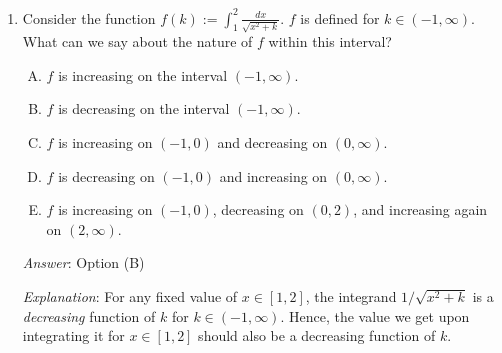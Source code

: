 \documentclass[10pt]{amsart}
\begin{document}
\begin{enumerate}
  \begin{enumerate}[(A)]
  \item $x\sqrt{1 + x^2}$
  \item $x^2\sqrt{1 + x^2}$
  \item $x(1 + x^2)^{1/3}$
  \item $x\sqrt{1 + x^3}$
  \item $x^2\sqrt{1 + x^3}$
  \end{enumerate}

  {\em Answer}: Option (D)

  {|em Explanation}: For options (A) and (C), the substitution $u = 1
  + x^2$ works fine. For option (E), the substitution $u = 1 + x^3$
  works fine. For option (B), we can solve the problem using a
  trigonometric substitution. This leaves option (D) (which,
  incidentally, requires the use of elliptic integrals).

  {\em Performance review}: $9$ out of $18$ people got this
  correct. $4$ chose (C), $4$ chose (B), $1$ chose (A).

  {\em Historical note}: This question appeared
  in a 153 quiz. At the time, $22$ out of $27$ people got this
  correct. $4$ people chose (B) and $1$ person chose (C).

\item Consider the function $f(k) := \int_1^2 \frac{dx}{\sqrt{x^2 +
  k}}$. $f$ is defined for $k \in (-1,\infty)$. What can we say about
  the nature of $f$ within this interval?

  \begin{enumerate}[(A)]
  \item $f$ is increasing on the interval $(-1,\infty)$.
  \item $f$ is decreasing on the interval $(-1,\infty)$.
  \item $f$ is increasing on $(-1,0)$ and decreasing on $(0,\infty)$.
  \item $f$ is decreasing on $(-1,0)$ and increasing on $(0,\infty)$.
  \item $f$ is increasing on $(-1,0)$, decreasing on $(0,2)$, and
    increasing again on $(2,\infty)$.
  \end{enumerate}

  {\em Answer}: Option (B)

  {\em Explanation}: For any fixed value of $x \in [1,2]$, the
  integrand $1/\sqrt{x^2 + k}$ is a {\em decreasing} function of $k$
  for $k \in (-1,\infty)$. Hence, the value we get upon integrating it
  for $x \in [1,2]$ should also be a decreasing function of $k$.


\end{enumerate}
\end{document}
